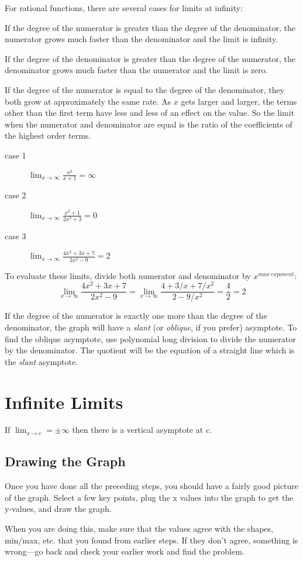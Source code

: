 \documentclass[fleqn]{exam}
\begin{document}
For rational functions, there are several cases for limits at infinity:
\begin{enumerate*}
  \item If the degree of the numerator is greater than the degree of the denominator, the numerator grows much faster
    than the denominator and the limit is infinity.  

  \item If the degree of the denominator is greater than the degree of the numerator, the denominator grows much faster
    than the numerator and the limit is zero.

  \item If the degree of the numerator is equal to the degree of the denominator, they both grow at approximately the
    same rate.  As $x$ gets larger and larger, the terms other than the first term have less and less of an effect on
    the value.  So the limit when the numerator and denominator are equal is the ratio of the coefficients of the
    highest order terms.
\end{enumerate*}

\begin{description}
  \item[case 1] $\lim_{x \to \infty} \frac{x^2}{x + 1} = \infty$
  \item[case 2] $\lim_{x \to \infty} \frac{x^2 + 1}{2x^3 + 3} = 0$
  \item[case 3] $\lim_{x \to \infty} \frac{4x^2 + 3x + 7}{2x^2 - 9} = 2$
\end{description}

To evaluate these limits, divide both numerator and denominator by $x^{max \ exponent}$:
\[
  \lim_{x \to \infty} \frac{4x^2 + 3x + 7}{2x^2 - 9} = \lim_{x \to \infty} \frac{4 + 3/x + 7/x^2}{2 - 9/x^2} 
    = \frac{4}{2} = 2
\]

If the degree of the numerator is exactly one more than the degree of the denominator, the graph will have a {\em slant}
(or {\em oblique}, if you prefer) asymptote.  To find the oblique asymptote, use polynomial long division to divide the
numerator by the denominator.  The quotient will be the equation of a straight line which is the {\em slant} asymptote.

\section{Infinite Limits}
If $\lim_{x \to c} = \pm \infty$ then there is a vertical asymptote at $c$.

\subsection{Drawing the Graph}
Once you have done all the preceding steps, you should have a fairly good picture of the graph.  Select a few key
points, plug the x values into the graph to get the y-values, and draw the graph.

When you are doing this, make sure that the values agree with the shapes, min/max, etc. that you found from earlier
steps.  If they don't agree, something is wrong---go back and check your earlier work and find the problem.
\end{document}
